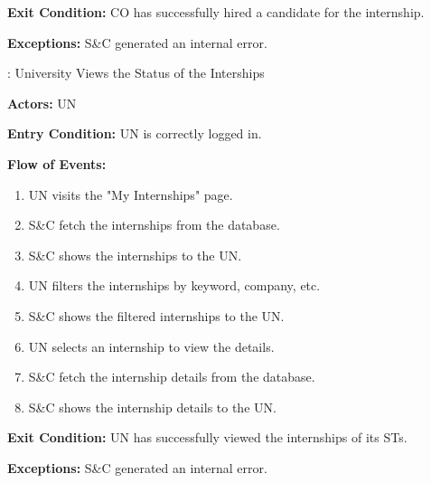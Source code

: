 \par \textbf{Exit Condition:} CO has successfully hired a candidate for the internship.

\par \textbf{Exceptions:}  S\&C generated an internal error.

\nextUseCaseID: University Views the Status of the Interships

\par \textbf{Actors:} UN

\par \textbf{Entry Condition:} UN is correctly logged in.

\par \textbf{Flow of Events:}

\begin{enumerate}
    \item UN visits the "My Internships" page.
    \item S\&C fetch the internships from the database.
    \item S\&C shows the internships to the UN.
    \item UN filters the internships by keyword, company, etc.
    \item S\&C shows the filtered internships to the UN.
    \item UN selects an internship to view the details.
    \item S\&C fetch the internship details from the database.
    \item S\&C shows the internship details to the UN.
\end{enumerate}

\par \textbf{Exit Condition:} UN has successfully viewed the internships of its STs.

\par \textbf{Exceptions:}  S\&C generated an internal error.
